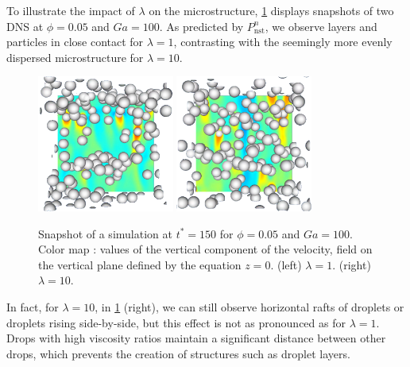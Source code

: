 To illustrate the impact of $\lambda$ on the microstructure, \ref{fig:images} displays snapshots of two DNS at $\phi = 0.05$ and $Ga = 100$. 
As predicted by $P_\text{nst}^n$, we observe layers and particles in close contact for $\lambda = 1$, contrasting with the seemingly more evenly dispersed microstructure for $\lambda = 10$.
\begin{figure}[h!]
   \centering
   \includegraphics[width=0.4\textwidth]{image/HOMOGENEOUS_NEW/P_PHI_5_l_10_Ga_100.png}
   \includegraphics[width=0.4\textwidth]{image/HOMOGENEOUS_NEW/P_PHI_5_l_1_Ga_100.png}
   \caption{Snapshot of a simulation at $t^* = 150$ for $\phi=0.05$ and $Ga=100$.
   Color map : values of the vertical component of the velocity, field on the vertical plane defined by the equation $z=0$. 
   (left)  $\lambda = 1$.
   (right)  $\lambda = 10$.
   }
   \label{fig:images}
\end{figure}
In fact, for $\lambda = 10$, in \ref{fig:images} (right), we can still observe horizontal rafts of droplets or droplets rising side-by-side, but this effect is not as pronounced as for $\lambda = 1$. 
Drops with high viscosity ratios maintain a significant distance between other drops, which prevents the creation of structures such as droplet layers.
